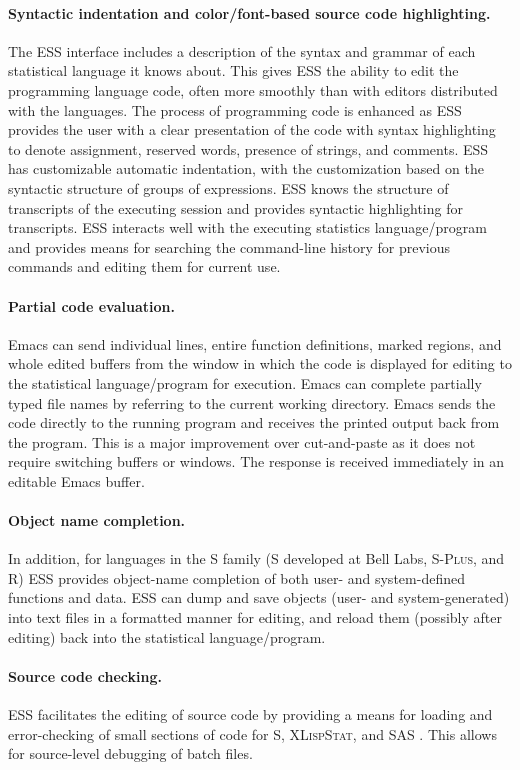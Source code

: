 \documentclass{article}
\newcommand*{\SAS}{\textsc{SAS}{\textregistered} }
\newcommand*{\Splus}{\textsc{S-Plus}}
\newcommand*{\XLispStat}{\textsc{XLispStat}}
\begin{document}
\paragraph{Syntactic indentation and color/font-based source code
  highlighting.}  The ESS interface includes a description of the
syntax and grammar of each statistical language it knows about.  This
gives ESS the ability to edit the programming language code, often
more smoothly than with editors distributed with the languages.  The
process of programming code is enhanced as ESS provides the user with
a clear presentation of the code with syntax highlighting to denote
assignment, reserved words, presence of strings, and comments.  ESS
has customizable automatic indentation, with the customization based
on the syntactic structure of groups of expressions.  ESS knows the
structure of transcripts of the executing session and provides
syntactic highlighting for transcripts.  ESS interacts well with the
executing statistics language/program and provides means for searching
the command-line history for previous commands and editing them for
current use.

\paragraph{Partial code evaluation.}
Emacs can send individual lines, entire function definitions, marked
regions, and whole edited buffers from the window in which the code is
displayed for editing to the statistical language/program for
execution.  Emacs can complete partially typed file names by referring
to the current working directory.  Emacs sends the code directly to
the running program and receives the printed output back from the
program.  This is a major improvement over cut-and-paste as it does
not require switching buffers or windows.  The response is received
immediately in an editable Emacs buffer.

\paragraph{Object name completion.}
In addition, for languages in the S family (S developed at Bell Labs,
\Splus, and R) ESS provides object-name completion of both user- and
system-defined functions and data.  ESS can dump and save objects
(user- and system-generated) into text files in a formatted manner for
editing, and reload them (possibly after editing) back into the
statistical language/program.

\paragraph{Source code checking.}
ESS facilitates the editing of source code by providing a means for
loading and error-checking of small sections of code for S,
\XLispStat, and \SAS.  This allows for source-level debugging of batch
files.
\end{document}
